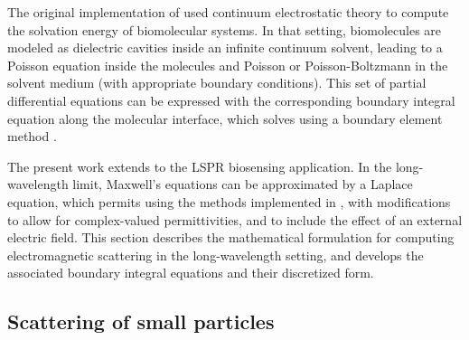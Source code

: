 
The original implementation of \pygbe used continuum electrostatic theory to compute
the solvation energy of biomolecular systems. In that setting, biomolecules are modeled as 
dielectric cavities inside an infinite continuum solvent, 
leading to a Poisson equation inside the molecules and Poisson or Poisson-Boltzmann in the solvent medium (with appropriate boundary conditions).
This set of partial differential equations can be 
expressed with the corresponding boundary integral equation along the molecular interface, 
which \pygbe solves using a boundary element method \cite{CooperBardhanBarba2013,CooperClementiBarba2015}.

The present work extends \pygbe to the LSPR biosensing application. 
In the long-wavelength limit, Maxwell's equations can be approximated by a Laplace equation,
which permits using the methods implemented in \pygbe, with modifications
to allow for complex-valued permittivities, and to include the
effect of an external electric field.
This section describes the mathematical formulation for computing electromagnetic scattering 
in the long-wavelength setting, and develops the associated boundary integral equations 
and their discretized form.

\subsection{Scattering of small particles} \label{sec:scattering_small}

